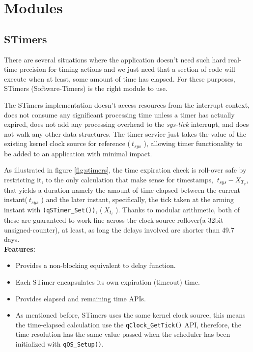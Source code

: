 \section{Modules}

\subsection{STimers}
There are several situations where the application doesn't need such hard real-time precision for timing actions and we just need that a section of code will execute when at least, some amount of time has elapsed. For these purposes, STimers (Software-Timers) is the right module to use. 

The STimers implementation doesn't access resources from the interrupt context, does not consume any significant processing time unless a timer has actually expired, does not add any processing overhead to the \textit{sys-tick} interrupt, and does not walk any other data structures. The timer service just takes the value of the existing kernel clock source for reference ($\ t_{sys}$ ), allowing timer functionality to be added to an application with minimal impact.



As illustrated in figure \ref{fig:stimers}, the time expiration check is roll-over safe by restricting it, to the only calculation that make sense for timestamps, $\ t_{sys} - X_{T_x}$, that yields a duration namely the amount of time elapsed between the current instant($\ t_{sys}$ ) and the later instant, specifically, the tick taken at the arming instant with \lstinline{(qSTimer_Set())}, ($\ X_{t_i}$ ).
Thanks to modular arithmetic, both of these are guaranteed to work fine across the clock-source rollover(a 32bit unsigned-counter), at least, as long the delays involved are shorter than 49.7 days. \\

\textbf{Features:}
\begin{itemize}
    \item Provides a non-blocking equivalent to delay function.
    \item Each STimer encapsulates its own expiration (timeout) time.
    \item Provides elapsed and remaining time APIs.
    \item As mentioned before, STimers uses the same kernel clock source, this means the time-elapsed calculation use the \lstinline{qClock_GetTick()} API, therefore, the time resolution has the same value passed when the scheduler has been initialized with \lstinline{qOS_Setup()}.
\end{itemize}

